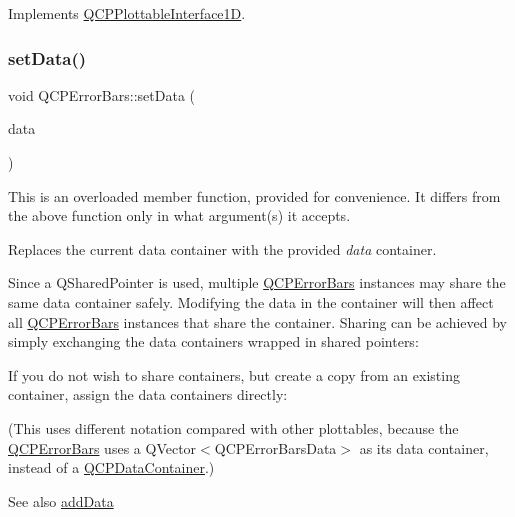Implements \hyperlink{classQCPPlottableInterface1D_a67093e4ccf490ff5f7750640941ff34c}{Q\+C\+P\+Plottable\+Interface1D}.

\mbox{\label{classQCPErrorBars_a92b1980003255f5f7c05407a4d92aabc}} 
\subsubsection{\texorpdfstring{set\+Data()}{setData()}\hspace{0.1cm}{\footnotesize\ttfamily [1/3]}}
{\footnotesize\ttfamily void Q\+C\+P\+Error\+Bars\+::set\+Data (\begin{DoxyParamCaption}\item[{Q\+Shared\+Pointer$<$ Q\+C\+P\+Error\+Bars\+Data\+Container $>$}]{data }\end{DoxyParamCaption})}

This is an overloaded member function, provided for convenience. It differs from the above function only in what argument(s) it accepts.

Replaces the current data container with the provided {\itshape data} container.

Since a Q\+Shared\+Pointer is used, multiple \hyperlink{classQCPErrorBars}{Q\+C\+P\+Error\+Bars} instances may share the same data container safely. Modifying the data in the container will then affect all \hyperlink{classQCPErrorBars}{Q\+C\+P\+Error\+Bars} instances that share the container. Sharing can be achieved by simply exchanging the data containers wrapped in shared pointers\+: 
\begin{DoxyCodeInclude}
\end{DoxyCodeInclude}
 If you do not wish to share containers, but create a copy from an existing container, assign the data containers directly\+: 
\begin{DoxyCodeInclude}
\end{DoxyCodeInclude}
(This uses different notation compared with other plottables, because the \hyperlink{classQCPErrorBars}{Q\+C\+P\+Error\+Bars} uses a {\ttfamily Q\+Vector$<$\+Q\+C\+P\+Error\+Bars\+Data$>$} as its data container, instead of a \hyperlink{classQCPDataContainer}{Q\+C\+P\+Data\+Container}.)

\begin{DoxySeeAlso}{See also}
\hyperlink{classQCPErrorBars_aae296ad9817b3fa418db284af81cecf8}{add\+Data} 
\end{DoxySeeAlso}
\mbox{\label{classQCPErrorBars_a2f33d68a7ec163b09017dce3d9d3abcc}} 
